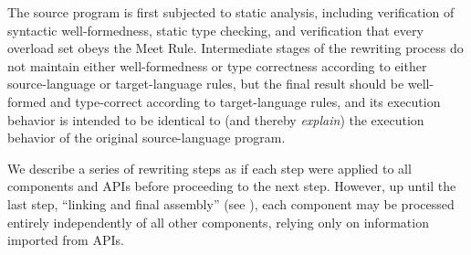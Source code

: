 The source program is first subjected to static analysis,
including verification of syntactic well-formedness, static type checking,
and verification that every overload set obeys the Meet Rule.
Intermediate stages of the rewriting process do not
maintain either well-formedness or type correctness according to either
source-language or target-language rules, but the final result
should be well-formed and type-correct according to target-language rules,
and its execution behavior is intended to be identical to (and thereby \emph{explain})
the execution behavior of the original source-language program.

We describe a series of rewriting steps as if each step were applied
to all components and APIs before proceeding to the next step.
However, up until the last step, ``linking and final assembly''
(see ),
each component may be processed entirely independently of all other
components, relying only on information imported from APIs.





